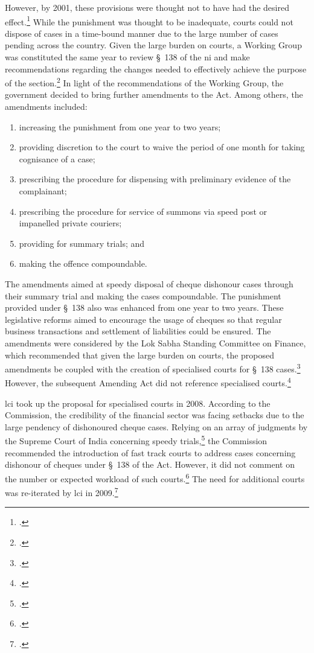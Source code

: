 However, by 2001, these provisions were thought not to have had the desired effect.\footcite{stdcomm2001_138niAct} While the punishment was thought to be inadequate, courts could not dispose of cases in a time-bound manner due to the large number of cases pending across the country. Given the large burden on courts, a Working Group was constituted the same year to review \S~138 of the \gls{ni} and make recommendations regarding the changes needed to effectively achieve the purpose of the section.\footcite{wg2001_138} In light of the recommendations of the Working Group, the government decided to bring further amendments to the Act. Among others, the amendments included:

\begin{enumerate}[label=(\alph*)]
 \item increasing the punishment from one year to two years;
 \item providing discretion to the court to waive the period of one month for taking cognisance of a case;
 \item prescribing the procedure for dispensing with preliminary evidence of the complainant;
 \item prescribing the procedure for service of summons via speed post or impanelled private couriers;
 \item providing for summary trials; and
 \item making the offence compoundable.
\end{enumerate}

The amendments aimed at speedy disposal of cheque dishonour cases through their summary trial and making the cases compoundable. The punishment provided under \S~138 also was enhanced from one year to two years. These legislative
reforms aimed to encourage the usage of cheques so that regular business transactions and settlement of liabilities could be ensured. The amendments were considered by the Lok Sabha Standing Committee on Finance, which recommended that given the large burden on courts, the proposed amendments be coupled with the creation of specialised courts for \S~138 cases.\footcite{stdcomm2001_138niAct} However, the subsequent Amending Act did not reference specialised courts.\footcite{niAmend2002} 

\gls{lci} took up the proposal for specialised courts in 2008. According to the Commission, the credibility of the financial sector was facing setbacks due to the large pendency of dishonoured cheque cases. Relying on an array of judgments by the Supreme Court of India concerning speedy trials,\footcite{sc1978_khatoon, sc1981_champalal, sc2005_surinder, sc2008_krishna} the Commission recommended the introduction of fast track courts to address cases concerning dishonour of cheques under \S~138 of the Act. However, it did not comment on the number or expected workload of such courts.\footcite{lci2008_138} The need for additional courts was re-iterated by \gls{lci} in 2009.\footcite{lci2009_reforms}

